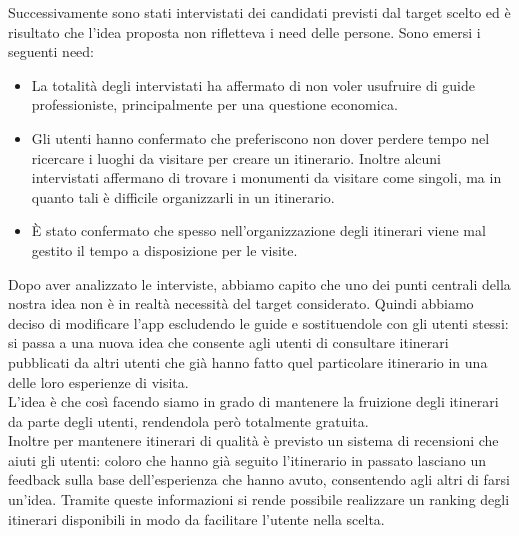 Successivamente sono stati intervistati dei candidati previsti dal target scelto ed è risultato che l'idea proposta non rifletteva i need delle persone. Sono emersi i seguenti need:
\begin{itemize}
	\item La totalità degli intervistati ha affermato di non voler usufruire di guide professioniste, principalmente per una questione economica.
	\item Gli utenti hanno confermato che preferiscono non dover perdere tempo nel ricercare i luoghi da visitare per creare un itinerario. Inoltre alcuni intervistati affermano di trovare i monumenti da visitare come singoli, ma in quanto tali è difficile organizzarli in un itinerario.
	\item È stato confermato che spesso nell'organizzazione degli itinerari viene mal gestito il tempo a disposizione per le visite.
\end{itemize}
Dopo aver analizzato le interviste, abbiamo capito che uno dei punti centrali della nostra idea non è in realtà necessità del target considerato. Quindi abbiamo deciso di modificare l'app escludendo le guide e sostituendole con gli utenti stessi: si passa a una nuova idea che consente agli utenti di consultare itinerari  pubblicati da altri utenti che già hanno fatto quel particolare itinerario in una delle loro esperienze di visita. \\
L'idea è che così facendo siamo in grado di mantenere la fruizione degli itinerari da parte degli utenti, rendendola però totalmente gratuita. \\
Inoltre per mantenere itinerari di qualità è previsto un sistema di recensioni che aiuti gli utenti: coloro che hanno già seguito l'itinerario in passato lasciano un feedback sulla base dell'esperienza che hanno avuto, consentendo agli altri di farsi un'idea. Tramite queste informazioni si rende possibile realizzare un ranking degli itinerari disponibili in modo da facilitare l'utente nella scelta.\\




